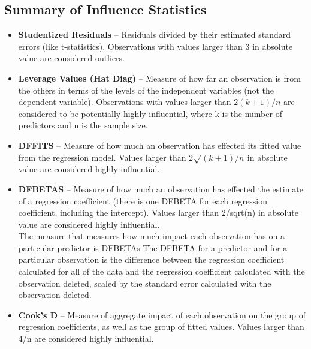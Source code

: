 \documentclass[residuals.tex]{subfiles}
\begin{document}
\subsection{Summary of Influence Statistics}
\begin{itemize}
	\item	\textbf{Studentized Residuals} – Residuals divided by their estimated standard errors (like t-statistics). Observations with values larger than 3 in absolute value are considered outliers.
	\item	\textbf{Leverage Values (Hat Diag)} – Measure of how far an observation is from the others in terms of the levels of the independent variables (not the dependent variable). Observations with values larger than $2(k+1)/n$ are considered to be potentially highly influential, where k is the number of predictors and n is the sample size.
	\item	\textbf{DFFITS} – Measure of how much an observation has effected its fitted value from the regression model. Values larger than $2\sqrt{(k+1)/n}$ in absolute value are considered highly influential. %
	\item	\textbf{DFBETAS} – Measure of how much an observation has effected the estimate of a regression coefficient (there is one DFBETA for each regression coefficient, including the intercept). Values larger than 2/sqrt(n) in absolute value are considered highly influential.
	\\
	The measure that measures how much impact each observation has on a particular predictor is DFBETAs The DFBETA for a predictor and for a particular observation is the difference between the regression coefficient calculated for all of the data and the regression coefficient calculated with the observation deleted, scaled by the standard error calculated with the observation deleted. 
	
	\item	\textbf{Cook’s D} – Measure of aggregate impact of each observation on the group of regression coefficients, as well as the group of fitted values. Values larger than 4/n are considered highly influential.
\end{itemize}
\end{document}
